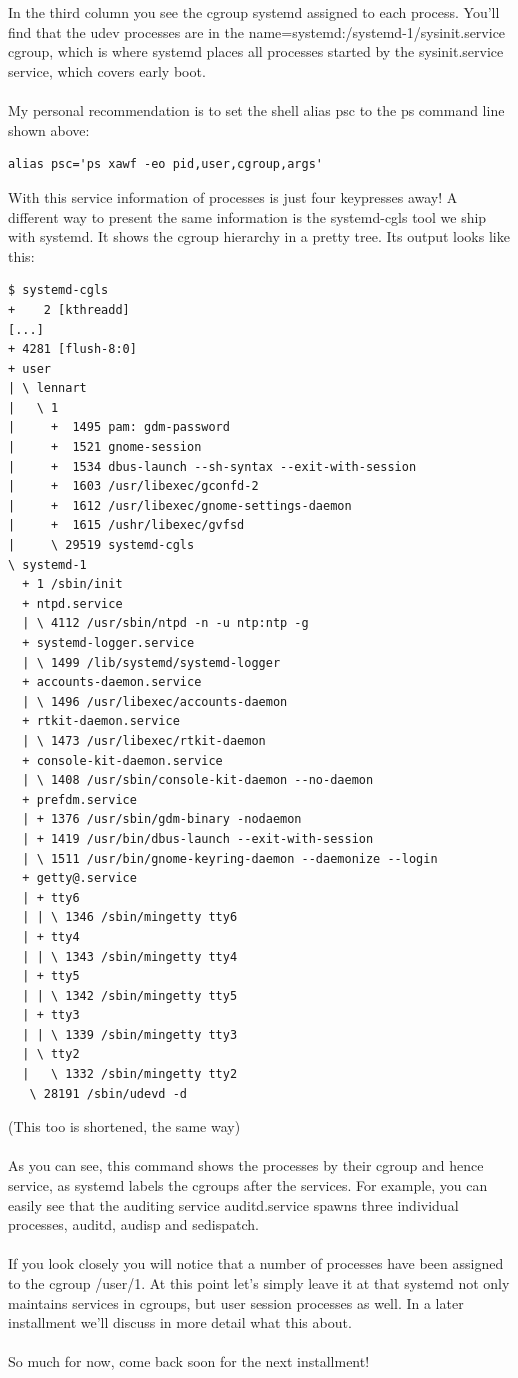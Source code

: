 \documentclass[titlepage]{article}
\begin{document}
\\
\\
In the third column you see the cgroup systemd assigned to each process. You'll find that the udev processes are in the name=systemd:/systemd-1/sysinit.service cgroup, which is where systemd places all processes started by the sysinit.service service, which covers early boot.
\\
\\
\newpage
My personal recommendation is to set the shell alias psc to the ps command line shown above:
\begin{lstlisting}
alias psc='ps xawf -eo pid,user,cgroup,args'
\end{lstlisting}
With this service information of processes is just four keypresses away! A different way to present the same information is the systemd-cgls tool we ship with systemd. It shows the cgroup hierarchy in a pretty tree. Its output looks like this:
\begin{lstlisting}
$ systemd-cgls
+    2 [kthreadd]
[...]
+ 4281 [flush-8:0]
+ user
| \ lennart
|   \ 1
|     +  1495 pam: gdm-password
|     +  1521 gnome-session
|     +  1534 dbus-launch --sh-syntax --exit-with-session
|     +  1603 /usr/libexec/gconfd-2
|     +  1612 /usr/libexec/gnome-settings-daemon
|     +  1615 /ushr/libexec/gvfsd
|     \ 29519 systemd-cgls
\ systemd-1
  + 1 /sbin/init
  + ntpd.service
  | \ 4112 /usr/sbin/ntpd -n -u ntp:ntp -g
  + systemd-logger.service
  | \ 1499 /lib/systemd/systemd-logger
  + accounts-daemon.service
  | \ 1496 /usr/libexec/accounts-daemon
  + rtkit-daemon.service
  | \ 1473 /usr/libexec/rtkit-daemon
  + console-kit-daemon.service
  | \ 1408 /usr/sbin/console-kit-daemon --no-daemon
  + prefdm.service
  | + 1376 /usr/sbin/gdm-binary -nodaemon
  | + 1419 /usr/bin/dbus-launch --exit-with-session
  | \ 1511 /usr/bin/gnome-keyring-daemon --daemonize --login
  + getty@.service
  | + tty6
  | | \ 1346 /sbin/mingetty tty6
  | + tty4
  | | \ 1343 /sbin/mingetty tty4
  | + tty5
  | | \ 1342 /sbin/mingetty tty5
  | + tty3
  | | \ 1339 /sbin/mingetty tty3
  | \ tty2
  |   \ 1332 /sbin/mingetty tty2
   \ 28191 /sbin/udevd -d
\end{lstlisting}
(This too is shortened, the same way)
\\
\\
As you can see, this command shows the processes by their cgroup and hence service, as systemd labels the cgroups after the services. For example, you can easily see that the auditing service auditd.service spawns three individual processes, auditd, audisp and sedispatch.
\\
\\
If you look closely you will notice that a number of processes have been assigned to the cgroup /user/1. At this point let's simply leave it at that systemd not only maintains services in cgroups, but user session processes as well. In a later installment we'll discuss in more detail what this about.
\\
\\
So much for now, come back soon for the next installment!
\end{document}
